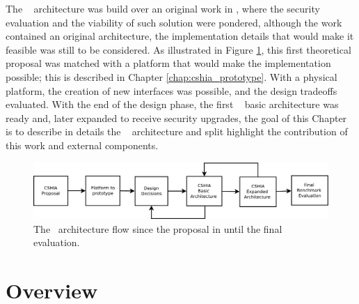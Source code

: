 

The \cshia~ architecture was build over an original work in  \cite{Hoffman2015}, where the security evaluation and the viability of such solution were pondered, although the work contained an original architecture, the implementation details that would make it feasible was still to be considered.  As illustrated in Figure \ref{fig:cshiaflow}, this first theoretical proposal was matched with a platform that would make the implementation possible; this is described in Chapter \ref{chap:cshia_prototype}.  With a physical platform, the creation of new interfaces was possible, and the design tradeoffs evaluated. With the end of the design phase, the first \cshia~ basic architecture was ready and, later expanded to receive security upgrades, the goal of this Chapter is to describe in details the \cshia~ architecture and split highlight the contribution of this work and external components.
\begin{figure}[!ht]
    \centering
    \includegraphics[width=\textwidth]{figures/pdf/arch_flow.pdf}
    \caption{The \cshia~architecture flow since the proposal in \cite{Hoffman2015} until the final evaluation.}
    \label{fig:cshiaflow}
\end{figure}



\section{Overview}
\label{sec:overviewarch}

